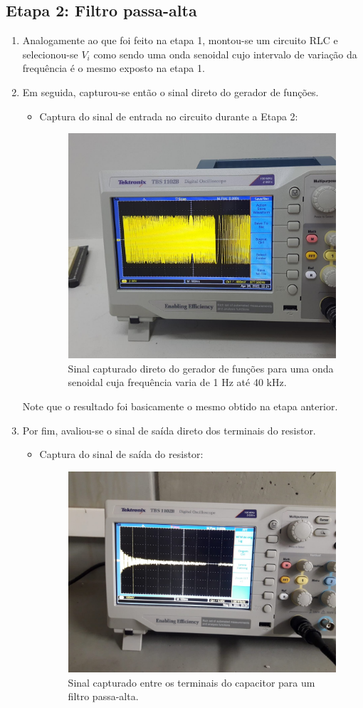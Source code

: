 \documentclass[letterpaper, 12pt]{article}
\begin{document}
\subsection{Etapa 2: Filtro passa-alta}\label{Etapa 2}
\begin{enumerate}
    \item Analogamente ao que foi feito na etapa 1, montou-se um circuito RLC e selecionou-se $V_{i}$ como sendo uma onda senoidal cujo intervalo de variação da frequência é o mesmo exposto na etapa 1.
    
    \item Em seguida, capturou-se então o sinal direto do gerador de funções.
    \begin{itemize}
        \item Captura do sinal de entrada no circuito durante a Etapa 2:
        \begin{figure}[h]
            \centering
            \includegraphics[width=0.5\linewidth]{figures/Input_signal.jpeg}
             \caption{Sinal capturado direto do gerador de funções para uma onda senoidal cuja frequência varia de 1 Hz até 40 kHz.}
            \label{fig:Input_signal-2}
        \end{figure}
    \end{itemize}
    
    Note que o resultado foi basicamente o mesmo obtido na etapa anterior.
    
    \item Por fim, avaliou-se o sinal de saída direto dos terminais do resistor.
    \begin{itemize}
        \item Captura do sinal de saída do resistor:
        \begin{figure}[h]
            \centering
            \includegraphics[width=0.5\linewidth]{figures/Band-stop_filter.jpeg}
            \caption{Sinal capturado entre os terminais do capacitor para um filtro passa-alta.}
            \label{fig:Band-stop Filter}
        \end{figure}
    \end{itemize}
    

\end{enumerate}
\end{document}
